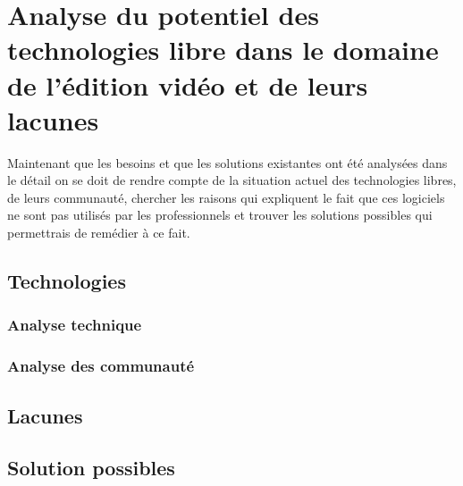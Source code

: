 \newpage
\section{Analyse du potentiel des technologies libre dans le domaine de l'édition
vidéo et de leurs lacunes}

Maintenant que les besoins et que les solutions existantes ont
été analysées dans le détail on se doit de rendre compte de la situation
actuel des technologies libres, de leurs communauté, chercher les raisons qui
expliquent le fait que ces logiciels ne sont pas utilisés par les
professionnels et trouver les solutions possibles qui permettrais de remédier à
ce fait.

  \subsection{Technologies}
    \subsubsection{Analyse technique}
    \subsubsection{Analyse des communauté}
  \subsection{Lacunes}
  \subsection{Solution possibles}


